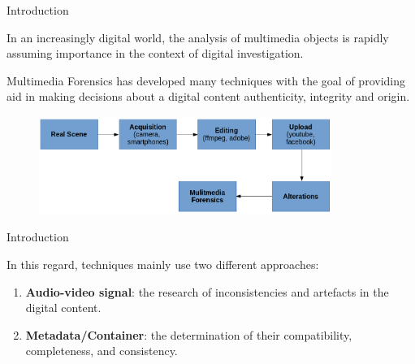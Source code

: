 \begin{tframe}{Introduction}

\vspace{0.2cm}

In an increasingly digital world, the analysis of multimedia objects is rapidly assuming importance in the context of digital investigation.

\vspace{0.5cm}

Multimedia Forensics has developed many techniques with the goal of providing aid in making decisions about a digital content authenticity, integrity and origin.

\begin{figure}
\centering
    \includegraphics[width=0.85\textwidth]{images/workflow.png}
\end{figure}

\end{tframe}

\begin{tframe}{Introduction}

\vspace{0.2cm}

In this regard, techniques mainly use two different approaches:

\begin{enumerate}
\item \textbf{Audio-video signal}: the research of inconsistencies and artefacts in the digital content.
\item \textbf{Metadata/Container}: the determination of their compatibility, completeness, and consistency.
\end{enumerate}

\end{tframe}

